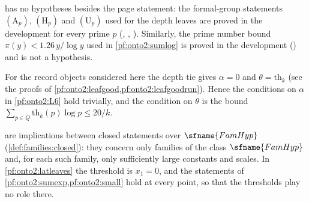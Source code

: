\begin{remark}\label{pf:onto2:rem:proved}
 has no hypotheses besides the page statement: the formal-group statements $(\mathrm A_p)$, $(\mathrm H_p)$ and
$(\mathrm U_p)$ used for the depth leaves are proved in the development for every prime $p$
(, ,
). Similarly, the prime number bound $\pi(y)<1.26\,y/\log y$ used in
\cref{pf:onto2:sumlog} is proved in the development () and is not
a hypothesis.
\end{remark}

\begin{remark}\label{pf:onto2:rem:alpha}
For the record objects considered here the depth tie gives $\alpha=0$ and $\theta=\mathrm{th}_k$ (see the proofs of
\cref{pf:onto2:leafgood,pf:onto2:leafgoodrun}). Hence the conditions on $\alpha$ in \ref{pf:onto2:L6} hold trivially, and the
condition on $\theta$ is the bound $\sum_{p\in Q}\mathrm{th}_k(p)\log p\le20/k$.
\end{remark}

\begin{remark}\label{pf:onto2:rem:closed}
 are implications between closed statements over $\sfname{FamHyp}$ (\cref{def:families:closed}):
they concern only families of the class $\sfname{FamHyp}$ and, for each such family, only sufficiently large constants and scales.
In \cref{pf:onto2:latleaves} the threshold is $x_1=0$, and the statements of \cref{pf:onto2:sumexp,pf:onto2:small} hold at every
point, so that the thresholds play no role there.
\end{remark}
